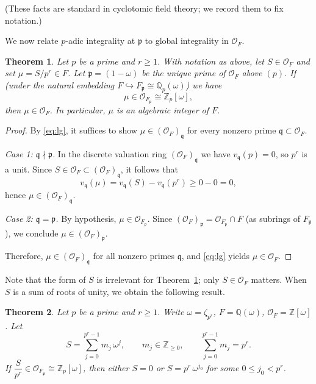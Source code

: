 \documentclass[11pt]{amsart}
\newtheorem{thm}{Theorem}[section]
\theoremstyle{definition}
\theoremstyle{remark}
\numberwithin{equation}{section}
\begin{document}
\noindent(These facts are standard in cyclotomic field theory; we record them to fix notation.)

\medskip

We now relate $p$-adic integrality at $\mathfrak{p}$ to global integrality in $\mathcal{O}_F$.

\begin{thm}\label{thm:local-global}
	Let $p$ be a prime and $r\ge 1$. With notation as above, let $S\in \mathcal{O}_F$ and set $\mu=S/p^r\in F$.
	Let $\mathfrak{p}=(1-\omega)$ be the unique prime of $\mathcal{O}_F$ above $(p)$. If (under the natural embedding
	$F\hookrightarrow F_{\mathfrak{p}}\cong \mathbb{Q}_p(\omega)$) we have
	\[
		\mu\in \mathcal{O}_{F_{\mathfrak{p}}}\cong \mathbb{Z}_p[\omega],
	\]
	then $\mu\in \mathcal{O}_F$. In particular, $\mu$ is an algebraic integer of $F$.
\end{thm}

\begin{proof}
	By \eqref{eq:lg}, it suffices to show $\mu\in (\mathcal{O}_F)_{\mathfrak{q}}$ for every nonzero prime
	$\mathfrak{q}\subset \mathcal{O}_F$.

	\emph{Case 1: $\mathfrak{q}\nmid \mathfrak{p}$.} In the discrete valuation ring $(\mathcal{O}_F)_{\mathfrak{q}}$ we have $v_{\mathfrak{q}}(p)=0$,
	so $p^r$ is a unit. Since $S\in \mathcal{O}_F\subset (\mathcal{O}_F)_{\mathfrak{q}}$, it follows that
	\[
		v_{\mathfrak{q}}(\mu)=v_{\mathfrak{q}}(S)-v_{\mathfrak{q}}(p^r)\ge 0-0=0,
	\]
	hence $\mu\in (\mathcal{O}_F)_{\mathfrak{q}}$.

	\emph{Case 2: $\mathfrak{q}=\mathfrak{p}$.} By hypothesis, $\mu\in \mathcal{O}_{F_{\mathfrak{p}}}$. Since
	$(\mathcal{O}_F)_{\mathfrak{p}}=\mathcal{O}_{F_{\mathfrak{p}}}\cap F$ (as subrings of $F_{\mathfrak{p}}$), we conclude
	$\mu\in (\mathcal{O}_F)_{\mathfrak{p}}$.

	Therefore, $\mu\in (\mathcal{O}_F)_{\mathfrak{q}}$ for all nonzero primes $\mathfrak{q}$, and \eqref{eq:lg} yields
	$\mu\in \mathcal{O}_F$.
\end{proof}

Note that the form of $S$ is irrelevant for Theorem~\ref{thm:local-global}; only $S\in\mathcal{O}_F$ matters. When $S$ is a sum of roots of unity, we obtain the following result.

\begin{thm}\label{thm:allpr}
	Let $p$ be a prime and $r\ge 1$. Write $\omega=\zeta_{p^r}$, $F=\mathbb{Q}(\omega)$, $\mathcal{O}_F=\mathbb{Z}[\omega]$.
	Let
	\[
		S=\sum_{j=0}^{p^r-1} m_j\,\omega^j,\qquad m_j\in\mathbb{Z}_{\ge 0},\qquad \sum_{j=0}^{p^r-1} m_j=p^r.
	\]
	If $\dfrac{S}{p^r}\in \mathcal{O}_{F_{\mathfrak{p}}}\cong \mathbb{Z}_p[\omega]$, then either $S=0$ or
	$S=p^r\,\omega^{j_0}$ for some $0\le j_0<p^r$.
\end{thm}
\end{document}
